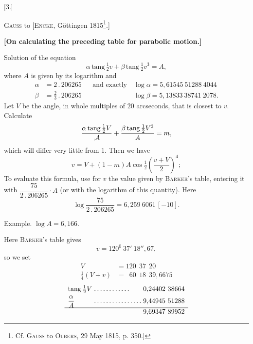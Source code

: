\clearpage
{}
\begingroup
\makeatletter
\newcommand{\LetterThreeFirstNote}[1]{\begingroup\renewcommand{\thefootnote}{*)}\long\def\@makefntext##1{\noindent [*)\ ##1}\footnote{#1}\endgroup}
\makeatother
\begin{center}
[3.]\par\medskip
\textsc{Gauss} to [\textsc{Encke}, Göttingen 1815\LetterThreeFirstNote{Cf. \textsc{Gauss} to \textsc{Olbers}, 29 May 1815, p. 350.]}.]\par\medskip
{\bfseries [On calculating the preceding table for parabolic motion.]}
\end{center}
\noindent\hspace*{\parindent}Solution of the equation
\[
\alpha\,\mathrm{tang}\,\tfrac12v+\beta\,\mathrm{tang}\,\tfrac12v^3=A,
\]
where \(A\) is given by its logarithm and
\[
\begin{aligned}
\alpha&=2\mathpunct{.}206265&&\text{and exactly}\quad\log\alpha=5{,}61545\ 51288\ 4044\\
\beta&=\tfrac23\mathpunct{.}206265&&\phantom{\text{and exactly}\quad}\log\beta=5{,}13833\ 38741\ 2078.
\end{aligned}
\]
Let \(V\) be the angle, in whole multiples of \(20\) arcseconds, that is closest to \(v\). Calculate
\[
\frac{\alpha\,\mathrm{tang}\,\tfrac12V}{\mathord{\text{\raisebox{-.35ex}{\(\scriptstyle:\)}}}A}
+\frac{\beta\,\mathrm{tang}\,\tfrac12V^3}{A}=m,
\]
which will differ very little from 1. Then we have
\[
v=V+(1-m)A\cos\tfrac12\left(\frac{v+V}{2}\right)^4;
\]
To evaluate this formula, use for \(v\) the value given by \textsc{Barker}'s table, entering it with \(\dfrac{75}{2\mathpunct{.}206265}\cdot A\) (or with the logarithm of this quantity). Here
\[
\log\frac{75}{2\mathpunct{.}206265}=6{,}259\ 6061\,[-10].
\]
\par\medskip
\noindent\hspace*{2\parindent}Example. \(\log A=6{,}166.\)
\par
\noindent\hspace*{\parindent}Here \textsc{Barker}'s table gives
\[
v=120^0\ 37'\ 18''{,}67,
\]
so we set
\[
\begin{aligned}
V&=120\ \ 37\ \ 20\\
\tfrac14(V+v)&=\phantom1 60\ \ 18\ \ 39{,}6675
\end{aligned}
\]
\[
\begin{array}{l@{\;}l@{\;}l}
\mathrm{tang}\,\tfrac12V & .\,.\,.\,.\,.\,.\,.\,.\,.\,.\,.\,. & 0{,}24402\ 38664\\[3pt]
\dfrac{\alpha}{A} & .\,.\,.\,.\,.\,.\,.\,.\,.\,.\,.\,.\,.\,.\,.\,. & 9{,}44945\ 51288\\[3pt]\hline
&&9{,}69347\ 89952
\end{array}
\]
